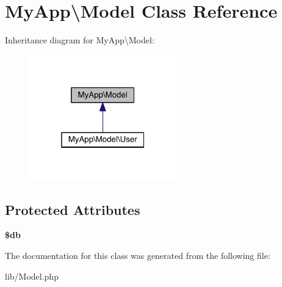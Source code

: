 \hypertarget{class_my_app_1_1_model}{}\section{My\+App\textbackslash{}Model Class Reference}
\label{class_my_app_1_1_model}


Inheritance diagram for My\+App\textbackslash{}Model\+:\nopagebreak
\begin{figure}[H]
\begin{center}
\leavevmode
\includegraphics[width=181pt]{class_my_app_1_1_model__inherit__graph}
\end{center}
\end{figure}
\subsection*{Protected Attributes}
\begin{DoxyCompactItemize}
\item 
{\bfseries \$db}\hypertarget{class_my_app_1_1_model_a59413d5b8ddb51939c3d841bfd5d7695}{}\label{class_my_app_1_1_model_a59413d5b8ddb51939c3d841bfd5d7695}

\end{DoxyCompactItemize}


The documentation for this class was generated from the following file\+:\begin{DoxyCompactItemize}
\item 
lib/Model.\+php\end{DoxyCompactItemize}
